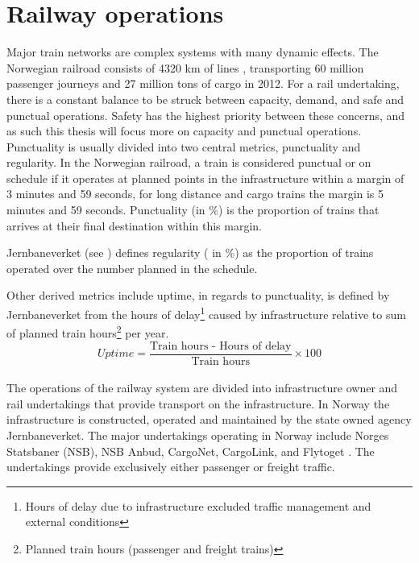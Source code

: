 
\section{Railway operations} %
\label{sec:railway_operations}
Major train networks are complex systems with many dynamic effects. The 
Norwegian railroad consists of 4320 km of lines \cite[p. 4]{jernbaneverketStatistikk}, transporting 60 million passenger journeys and 27 
million tons of cargo in 2012\cite[p. 9]{jernbaneverketStatistikk}. For a rail 
undertaking, there is a constant balance to be struck between capacity, demand, 
and safe and punctual operations. Safety has the highest priority between 
these concerns, and as such this thesis will focus more on capacity and 
punctual operations.\\

Punctuality is usually divided into two central metrics, punctuality and 
regularity. In the Norwegian railroad, a train is considered punctual or on 
schedule if it operates at planned points in the infrastructure within a 
margin of 3 minutes and 59 seconds, for long distance and cargo trains the 
margin is 5 minutes and 59 seconds. Punctuality (in \%) is the proportion of 
trains that arrives at their final destination within this margin.

Jernbaneverket (see ) defines regularity (
in \%) as the proportion of trains operated over the number planned in the 
schedule. 

Other derived metrics include uptime, in regards to punctuality, is defined by 
Jernbaneverket from 
the hours of delay\footnote{Hours of delay due to infrastructure excluded 
traffic	management and external conditions} caused by infrastructure relative 
to sum of planned train hours\footnote{Planned train hours (passenger and 
freight trains)} per year.\cite{jernbaneverketPunklighetsTall}
\begin{equation} \label{eq:uptime}
		Uptime =
		\frac
				{
					\text{Train hours - Hours of delay}
				}
				{
					\text{Train hours}
				}\times 100 
\end{equation}\\

The operations of the railway system are divided into infrastructure owner and 
rail undertakings that provide transport on the infrastructure. In Norway the 
infrastructure is constructed, operated and maintained by the state owned 
agency Jernbaneverket. The major undertakings operating in Norway  include 
Norges Statsbaner (NSB), NSB Anbud, CargoNet, CargoLink, and Flytoget \cite{ wiki:NorwegianRailway}. The undertakings provide exclusively either passenger 
or freight traffic.\\

